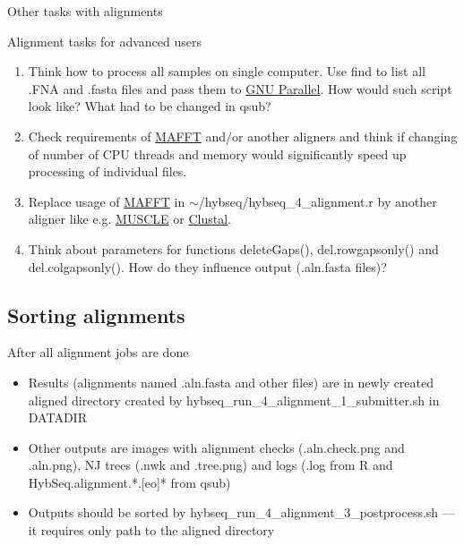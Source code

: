 \documentclass[compress, ucs, xelatex, 11pt, xcolor=x11names, aspectratio=1609,
	hyperref={
		bookmarks=true,
		unicode=true,
		colorlinks=true,
		pdftitle={HybSeq course},
		plainpages=false,
		pdfauthor={Vojtech Zeisek},
		pdfsubject={Practical processing of HybSeq target enrichment sequencing data on computing grids like MetaCentrum},
		pdfcreator={XeLaTeX},
		pdfkeywords={BASH, command line, GNU, HybSeq, Linux, MetaCentrum, sequencing shell, target enrichment},
		linkcolor=Cyan2, %
		anchorcolor=Firebrick2, %
		citecolor=Firebrick2, %
		filecolor=Firebrick2, %
		menucolor=Firebrick2, %
		urlcolor=Chartreuse2, %
		pdftex},
	url={hyphens, lowtilde} %
	]{beamer}
\renewcommand{\texttt}[1]{\colorbox{Snow4}{{\ttfamily #1}}}
\begin{document}
\begin{frame}{Other tasks with alignments}
	\begin{exampleblock}{Alignment tasks for advanced users}
		\begin{enumerate}
			\item Think how to process all samples on single computer. Use \texttt{find} to list all \texttt{*.FNA} and \texttt{*.fasta} files and pass them to \href{https://www.gnu.org/software/parallel/}{GNU Parallel}. How would such script look like? What had to be changed in \texttt{qsub}?
			\item Check requirements of \href{https://mafft.cbrc.jp/alignment/software/}{MAFFT} and/or another aligners and think if changing of number of CPU threads and memory would significantly speed up processing of individual files.
			\item Replace usage of \href{https://mafft.cbrc.jp/alignment/software/}{MAFFT} in \texttt{$\sim$/hybseq/hybseq\_4\_alignment.r} by another aligner like e.g. \href{https://www.drive5.com/muscle/}{MUSCLE} or \href{http://clustal.org/}{Clustal}.
			\item Think about parameters for functions \texttt{deleteGaps()}, \texttt{del.rowgapsonly()} and \texttt{del.colgapsonly()}. How do they influence output (\texttt{*.aln.fasta} files)?
		\end{enumerate}
	\end{exampleblock}
\end{frame}

\subsection{Sorting alignments}

\begin{frame}{After all alignment jobs are done}
	\begin{itemize}
		\item Results (alignments named \texttt{*.aln.fasta} and other files) are in newly created \texttt{aligned} directory created by \texttt{hybseq\_run\_4\_alignment\_1\_submitter.sh} in \texttt{DATADIR}
		\item Other outputs are images with alignment checks (\texttt{*.aln.check.png} and \texttt{*.aln.png}), NJ trees (\texttt{*.nwk} and \texttt{*.tree.png}) and logs (\texttt{*.log} from \texttt{R} and \texttt{HybSeq.alignment.*.[eo]*} from \texttt{qsub})
		\item Outputs should be sorted by \texttt{hybseq\_run\_4\_alignment\_3\_postprocess.sh} --- it requires only path to the \texttt{aligned} directory
	\end{itemize}
\end{frame}
\end{document}
